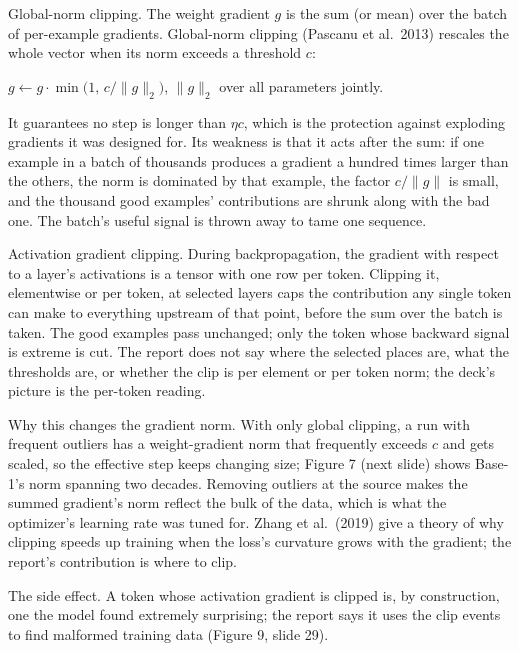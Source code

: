 \documentclass[11pt,letterpaper]{article}
\newenvironment{formulas}{\begin{tcolorbox}[formulabox]}{\end{tcolorbox}}
\begin{document}
Global-norm clipping. The weight gradient $g$ is the sum (or mean) over the batch of per-example gradients. Global-norm clipping (Pascanu et al.\ 2013) rescales the whole vector when its norm exceeds a threshold $c$:
\begin{formulas}
$g\leftarrow g\cdot\min\!\big(1,\,c/\|g\|_2\big)$, \qquad $\|g\|_2$ over all parameters jointly.
\end{formulas}
It guarantees no step is longer than $\eta c$, which is the protection against exploding gradients it was designed for. Its weakness is that it acts after the sum: if one example in a batch of thousands produces a gradient a hundred times larger than the others, the norm is dominated by that example, the factor $c/\|g\|$ is small, and the thousand good examples' contributions are shrunk along with the bad one. The batch's useful signal is thrown away to tame one sequence.

Activation gradient clipping. During backpropagation, the gradient with respect to a layer's activations is a tensor with one row per token. Clipping it, elementwise or per token, at selected layers caps the contribution any single token can make to everything upstream of that point, before the sum over the batch is taken. The good examples pass unchanged; only the token whose backward signal is extreme is cut. The report does not say where the selected places are, what the thresholds are, or whether the clip is per element or per token norm; the deck's picture is the per-token reading.

Why this changes the gradient norm. With only global clipping, a run with frequent outliers has a weight-gradient norm that frequently exceeds $c$ and gets scaled, so the effective step keeps changing size; Figure 7 (next slide) shows Base-1's norm spanning two decades. Removing outliers at the source makes the summed gradient's norm reflect the bulk of the data, which is what the optimizer's learning rate was tuned for. Zhang et al.\ (2019) give a theory of why clipping speeds up training when the loss's curvature grows with the gradient; the report's contribution is where to clip.

The side effect. A token whose activation gradient is clipped is, by construction, one the model found extremely surprising; the report says it uses the clip events to find malformed training data (Figure 9, slide 29).
\end{document}
